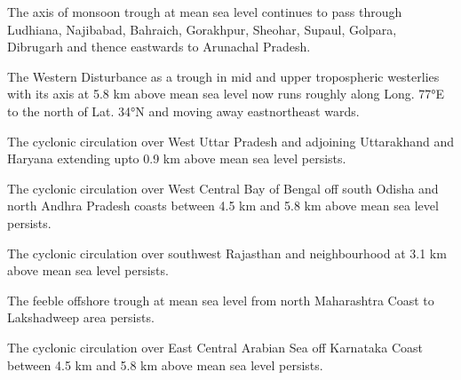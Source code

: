 \item The   axis   of   monsoon   trough   at   mean   sea   level   continues   to   pass   through   Ludhiana, 
Najibabad, Bahraich, Gorakhpur, Sheohar, Supaul, Golpara, Dibrugarh and thence eastwards to 
Arunachal Pradesh.
\item The Western Disturbance as a trough in mid and upper tropospheric westerlies with its axis at 5.8 
km above mean sea level now runs roughly along Long. 77°E to the north of Lat. 34°N and 
moving away east­northeast wards.
\item The   cyclonic   circulation   over   West   Uttar   Pradesh   and   adjoining   Uttarakhand   and   Haryana 
extending upto 0.9 km above mean sea level persists.
\item The cyclonic circulation over West Central Bay of Bengal off south Odisha and north Andhra 
Pradesh coasts between 4.5 km and 5.8 km above mean sea level persists.
\item The cyclonic circulation over southwest Rajasthan and neighbourhood at 3.1 km above mean sea 
level persists.
\item The feeble off­shore trough at mean sea level from north Maharashtra Coast to Lakshadweep 
area persists.
\item The cyclonic circulation over East Central Arabian Sea off Karnataka Coast between 4.5 km and 
5.8 km above mean sea level persists.